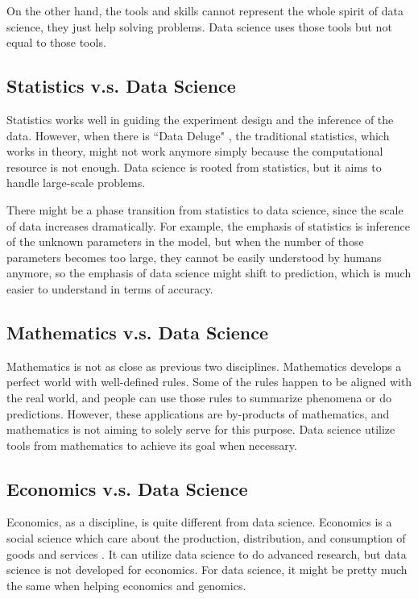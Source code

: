 On the other hand, the tools and skills cannot represent the whole spirit of data science, they just help solving problems.
Data science uses those tools but not equal to those tools.

\subsection*{Statistics v.s. Data Science}

Statistics works well in guiding the experiment design and the inference of the data.
However, when there is ``Data Deluge" \cite{hey_data_2003}, the traditional statistics, which works in theory, might not work anymore simply because the computational resource is not enough.
Data science is rooted from statistics, but it aims to handle large-scale problems. 

There might be a phase transition from statistics to data science, since the scale of data increases dramatically.
For example, the emphasis of statistics is inference of the unknown parameters in the model, but when the number of those parameters becomes too large, they cannot be easily understood by humans anymore, so the emphasis of data science might shift to prediction, which is much easier to understand in terms of accuracy.

\subsection*{Mathematics v.s. Data Science}

Mathematics is not as close as previous two disciplines.
Mathematics develops a perfect world with well-defined rules.
Some of the rules happen to be aligned with the real world, and people can use those rules to summarize phenomena or do predictions.
However, these applications are by-products of mathematics, and mathematics is not aiming to solely serve for this purpose. 
Data science utilize tools from mathematics to achieve its goal when necessary.

\subsection*{Economics v.s. Data Science}

Economics, as a discipline, is quite different from data science.
Economics is a social science which care about the production, distribution, and consumption of goods and services \cite{webster_economics}.
It can utilize data science to do advanced research, but data science is not developed for economics.
For data science, it might be pretty much the same when helping economics and genomics.

